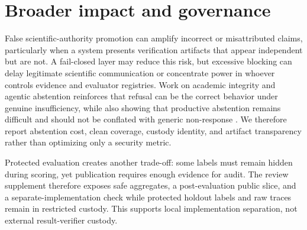 \section{Broader impact and governance}
False scientific-authority promotion can amplify incorrect or misattributed claims, particularly when a system presents verification artifacts that appear independent but are not. A fail-closed layer may reduce this risk, but excessive blocking can delay legitimate scientific communication or concentrate power in whoever controls evidence and evaluator registries. Work on academic integrity and agentic abstention reinforces that refusal can be the correct behavior under genuine insufficiency, while also showing that productive abstention remains difficult and should not be conflated with generic non-response \citep{sciintegrity2026,agentabstain2026}. We therefore report abstention cost, clean coverage, custody identity, and artifact transparency rather than optimizing only a security metric.

Protected evaluation creates another trade-off: some labels must remain hidden during scoring, yet publication requires enough evidence for audit. The review supplement therefore exposes safe aggregates, a post-evaluation public slice, and a separate-implementation check while protected holdout labels and raw traces remain in restricted custody. This supports local implementation separation, not external result-verifier custody.
